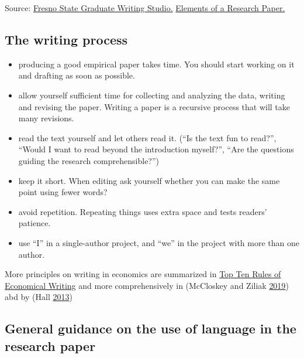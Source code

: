 \documentclass[
]{book}
\providecommand{\tightlist}{%
  \setlength{\itemsep}{0pt}\setlength{\parskip}{0pt}}
\begin{document}
Source:
\href{http://www.fresnostate.edu/academics/gradstudies/graduatewritingstudio.html}{Fresno
State Graduate Writing Studio.}
\href{https://fresnostategraduatewritingstudio.files.wordpress.com/2015/09/elements-of-a-research-paper.pdf}{Elements
of a Research Paper.}

\hypertarget{the-writing-process}{%
\subsection{The writing process}\label{the-writing-process}}

\begin{itemize}
\tightlist
\item
  producing a good empirical paper takes time. You should start working
  on it and drafting as soon as possible.
\item
  allow yourself sufficient time for collecting and analyzing the data,
  writing and revising the paper. Writing a paper is a recursive process
  that will take many revisions.
\item
  read the text yourself and let others read it. (``Is the text fun to
  read?'', ``Would I want to read beyond the introduction myself?'',
  ``Are the questions guiding the research comprehensible?'')
\item
  keep it short. When editing ask yourself whether you can make the same
  point using fewer words?
\item
  avoid repetition. Repeating things uses extra space and tests readers'
  patience.\\
\item
  use ``I'' in a single-author project, and ``we'' in the project with
  more than one author.
\end{itemize}

More principles on writing in economics are summarized in
\href{http://www3.nccu.edu.tw/~jthuang/rules.html}{Top Ten Rules of
Economical Writing} and more comprehensively in (McCloskey and Ziliak
\protect\hyperlink{ref-mccloskey_economical_2019}{2019}) abd by (Hall
\protect\hyperlink{ref-hall_how_2013}{2013})

\hypertarget{general-guidance-on-the-use-of-language-in-the-research-paper}{%
\subsection{General guidance on the use of language in the research
paper}\label{general-guidance-on-the-use-of-language-in-the-research-paper}}
\end{document}
